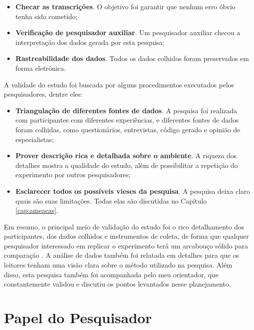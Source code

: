 \begin{itemize}
	\item \textbf{Checar as transcrições}. O objetivo foi garantir que nenhum erro
	óbvio tenha sido cometido;

	\item \textbf{Verificação de pesquisador auxiliar}. Um pesquisador auxiliar
	checou a interpretação dos dados gerada por esta pesquisa;
	
	\item \textbf{Rastreabilidade dos dados}. Todos os dados colhidos foram
	preservados em forma eletrônica.

\end{itemize}

A validade do estudo foi buscada por alguns procedimentos executados pelos
pesquisadores, dentre eles:

\begin{itemize}
	\item \textbf{Triangulação de diferentes fontes de dados}. A pesquisa foi
	realizada com participantes com diferentes experiências, e diferentes
	fontes de dados foram colhidas, como questionários, entrevistas, código gerado e 
	opinião de especialistas;

	\item \textbf{Prover descrição rica e detalhada sobre o ambiente}. A riqueza
	dos detalhes mostra a qualidade do estudo, além de possibilitar a repetição do
	experimento por outros pesquisadores;

	\item \textbf{Esclarecer todos os possíveis vieses da pesquisa}. A pesquisa
	deixa claro quais são suas limitações. Todas elas são discutidas no Capítulo
	\ref{cap:ameacas}.

\end{itemize}

Em resumo, o principal meio de validação do estudo foi o rico detalhamento dos
participantes, dos dados colhidos e instrumentos de coleta, de forma
que qualquer pesquisador interessado em replicar o experimento terá um
arcabouço sólido para comparação \cite{merriam-1998}. A análise de
dados também foi relatada em detalhes para que os leitores tenham uma visão
clara sobre o método utilizado na pesquisa. 
Além disso, esta pesquisa também foi acompanhada pelo meu orientador,
que constantemente validou e discutiu os pontos levantados nesse planejamento.

\section{Papel do Pesquisador}
\label{sec:planejamento-papel}

